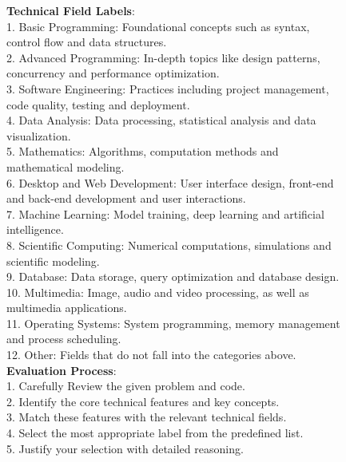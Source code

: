 \documentclass[11pt, a4paper, logo, copyright, nonumbering, amsart]{map}
\begin{document}
\begin{CJK*}{UTF8}{gbsn}
\begin{figure*}[h!]
\begin{center}
\begin{tcolorbox}[width=1\textwidth, colback=lightblue, title={\textbf{Prompt for Classify Application Scenarios in ``Code QA'' Subset}}]
    \textbf{Technical Field Labels}:\\
    1. Basic Programming: Foundational concepts such as syntax, control flow and data structures.\\
    2. Advanced Programming: In-depth topics like design patterns, concurrency and performance optimization.\\
    3. Software Engineering: Practices including project management, code quality, testing and deployment.\\
    4. Data Analysis: Data processing, statistical analysis and data visualization.\\
    5. Mathematics: Algorithms, computation methods and mathematical modeling.\\
    6. Desktop and Web Development: User interface design, front-end and back-end development and user interactions.\\
    7. Machine Learning: Model training, deep learning and artificial intelligence.\\
    8. Scientific Computing: Numerical computations, simulations and scientific modeling.\\
    9. Database: Data storage, query optimization and database design.\\
    10. Multimedia: Image, audio and video processing, as well as multimedia applications.\\
    11. Operating Systems: System programming, memory management and process scheduling.\\
    12. Other: Fields that do not fall into the categories above.\\
    
    \textbf{Evaluation Process}:\\
    1. Carefully Review the given problem and code.\\
    2. Identify the core technical features and key concepts.\\
    3. Match these features with the relevant technical fields.\\
    4. Select the most appropriate label from the predefined list.\\
    5. Justify your selection with detailed reasoning.\\
    

\end{tcolorbox}
\end{center}
\end{figure*}
\end{CJK*}
\end{document}
